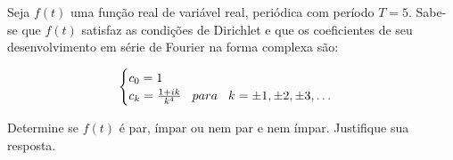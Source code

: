 \linespread{1.5}
Seja $f(t)$ uma função real de variável real, periódica com período $T=5$. Sabe-se que $f(t)$ satisfaz as condições de Dirichlet e que os coeficientes de seu desenvolvimento em série de Fourier na forma complexa são:

{\large \begin{equation*}
    \begin{cases}
        c_0 = 1\\
        c_k = {\Huge \frac{1+ik}{k^4}} \hspace{0.3cm} para \hspace{0.3cm} k = \pm 1, \pm 2, \pm 3, \hdots
    \end{cases}
\end{equation*}}

Determine se $f(t)$ é par, ímpar ou nem par e nem ímpar. Justifique sua resposta.